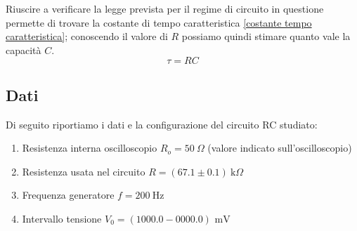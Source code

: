 \documentclass[letterpaper,12pt]{article}
\begin{document}
Riuscire a verificare la legge prevista per il regime di circuito in questione permette di trovare la costante di tempo caratteristica \ref{costante tempo caratteristica}; conoscendo il valore di $R$ possiamo quindi stimare quanto vale la capacità $C$.
\begin{equation}
    \tau = RC
    \label{costante tempo caratteristica}
\end{equation}
\newpage



\subsection{Dati}
Di seguito riportiamo i dati e la configurazione del circuito RC studiato:
\begin{enumerate}[itemsep=1pt]
    \item Resistenza interna oscilloscopio $R_o = 50\ \Omega$ (valore indicato sull'oscilloscopio)
    \item Resistenza usata nel circuito $R = (67.1\pm0.1)\ \text{k}\Omega$
    \item Frequenza generatore $f = \SI{200}{\hertz}$
    \item Intervallo tensione $V_0= (1000.0 - 0000.0) \text{ mV}$
\end{enumerate}


\end{document}
